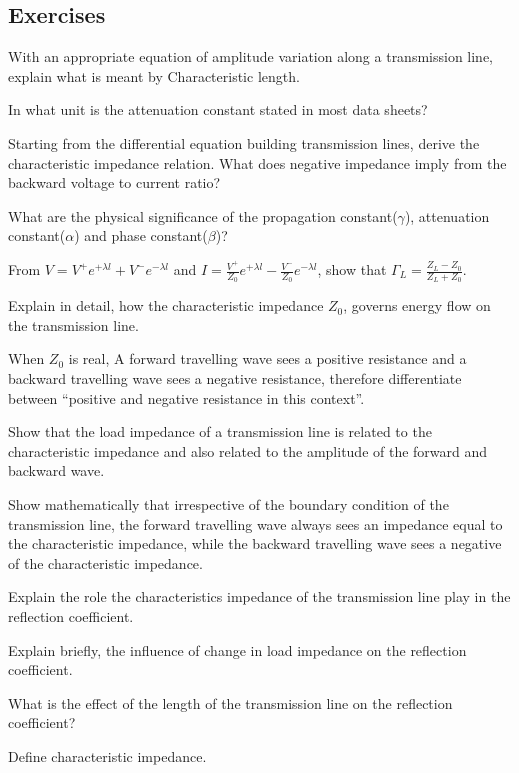 \begin{mdframed}[backgroundcolor=lightblue, linewidth=1pt, hidealllines=true]
\section*{Exercises}
\begin{ExerciseList}
\Exercise[label={ex31}]
With an appropriate equation of amplitude variation along a transmission line, explain what is meant by Characteristic length.

\Exercise[label={ex32}]
In what unit is the attenuation constant stated in most data sheets?

\Exercise[label={ex33}]
Starting from the differential equation building transmission lines, derive the characteristic impedance relation. What does negative impedance imply from the backward voltage to current ratio?

\Exercise[label={ex34}]
What are the physical significance of the propagation constant($\gamma$), attenuation constant($\alpha$) and phase constant($\beta$)?

\Exercise[label={ex36}]
From $ V = V^+e^{+\lambda l} + V^-e^{-\lambda l} $ and $ I = \frac{V^+}{Z_0}e^{+\lambda l} - \frac{V^-}{Z_0}e^{-\lambda l}$, show that $ \Gamma_L = \frac{Z_L - Z_0}{Z_L + Z_0} $.

\Exercise[label={ex213}]
Explain in detail, how the characteristic impedance $Z_0$, governs energy flow on the transmission line.

\Exercise[label={ex214}]
When $Z_0$ is real, A forward travelling wave sees a positive resistance and a backward travelling wave sees a negative resistance, therefore differentiate between ``positive and negative resistance in this context''.

\Exercise[label={ex215}]
Show that the load impedance of a transmission line is related to the characteristic impedance and also related to the amplitude of the forward and backward wave.

\Exercise[label={ex216}]
Show mathematically that irrespective of the boundary condition of the transmission line, the forward travelling wave always sees an impedance equal to the characteristic impedance, while the backward travelling wave sees a negative of the characteristic impedance.

\Exercise[label={ex217}]
Explain the role the characteristics impedance of the transmission line play in the reflection coefficient.

\Exercise[label={ex217}]
Explain briefly, the influence of change in load impedance on the reflection coefficient.

\Exercise[label={ex217}]
What is the effect of the length of the transmission line on the reflection coefficient?

\Exercise[label={ex217}]
Define characteristic impedance.
\end{ExerciseList}
\end{mdframed}
